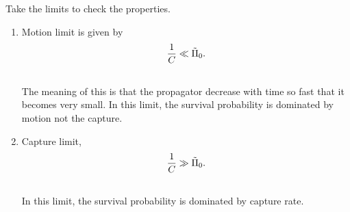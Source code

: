 \documentclass[letterpaper,10pt,english]{sphinxmanual}
\begin{document}
Take the limits to check the properties.
\begin{enumerate}
\item {} 
Motion limit is given by
\begin{gather}
\begin{split}\frac{1}{C} \ll \tilde \Pi_0 .\end{split}\notag\\\begin{split}\end{split}\notag
\end{gather}
The meaning of this is that the propagator decrease with time so fast that it becomes very small. In this limit, the survival probability is dominated by motion not the capture.

\item {} 
Capture limit,
\begin{gather}
\begin{split}\frac{1}{C} \gg \tilde \Pi_0 .\end{split}\notag\\\begin{split}\end{split}\notag
\end{gather}
In this limit, the survival probability is dominated by capture rate.

\end{enumerate}
\end{document}
